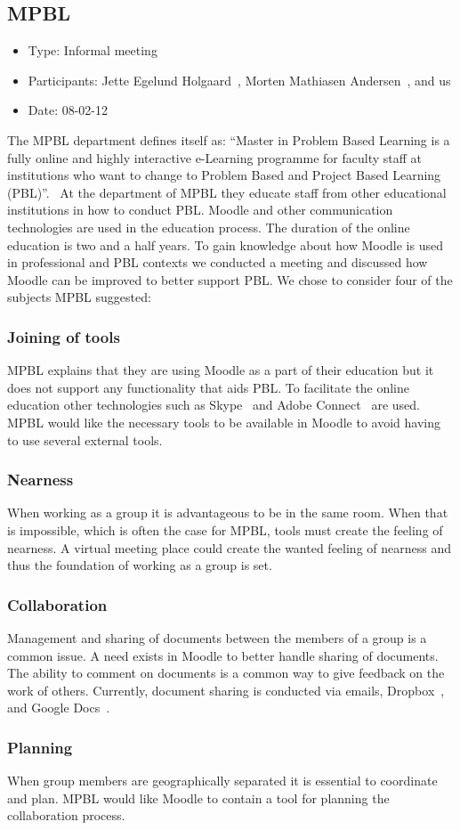 \subsection{MPBL}
\label{sub:mpblInterview}
\begin{itemize}
	\item Type: Informal meeting
	\item Participants: Jette Egelund Holgaard~\cite{jette}, Morten Mathiasen Andersen~\cite{morten}, and us
	\item Date: 08-02-12
\end{itemize}
The MPBL department defines itself as:
``Master in Problem Based Learning is a fully online and highly interactive e-Learning programme for faculty staff at institutions who want to change to Problem Based and Project Based Learning (PBL)''.~\cite{mpbl}
At the department of MPBL they educate staff from other educational institutions in how to conduct PBL.
Moodle and other communication technologies are used in the education process. 
The duration of the online education is two and a half years.
To gain knowledge about how Moodle is used in professional and PBL contexts we conducted a meeting and discussed how Moodle can be improved to better support PBL. 
We chose to consider four of the subjects MPBL suggested:

\subsubsection{Joining of tools} MPBL explains that they are using Moodle as a part of their education but it does not support any functionality that aids PBL. 
To facilitate the online education other technologies such as Skype~\cite{skype} and Adobe Connect~\cite{adobe} are used. 
MPBL would like the necessary tools to be available in Moodle to avoid having to use several external tools.     

\subsubsection{Nearness} When working as a group it is advantageous to be in the same room.
When that is impossible, which is often the case for MPBL, tools must create the feeling of nearness. 
A virtual meeting place could create the wanted feeling of nearness and thus the foundation of working as a group is set.

\subsubsection{Collaboration} Management and sharing of documents between the members of a group is a common issue. 
A need exists in Moodle to better handle sharing of documents. 
The ability to comment on documents is a common way to give feedback on the work of others.
Currently, document sharing is conducted via emails, Dropbox~\cite{dropbox}, and Google Docs~\cite{googledocs}.

\subsubsection{Planning} When group members are geographically separated it is essential to coordinate and plan.
MPBL would like Moodle to contain a tool for planning the collaboration process.